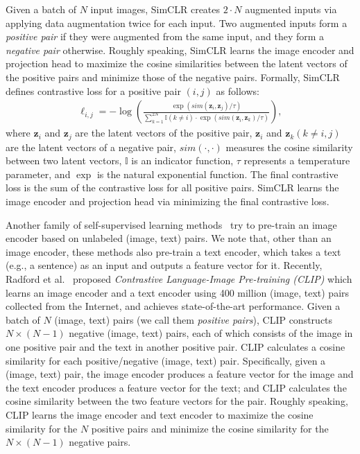 Given a batch of $N$ input images, SimCLR creates $2\cdot N$ augmented inputs via applying data augmentation twice for each input. Two augmented inputs form a \emph{positive pair} if they were augmented from the same input, and they form a \emph{negative pair} otherwise.  
Roughly speaking, SimCLR learns the image encoder and projection head to maximize the cosine similarities between the latent vectors of the positive pairs and minimize those of the negative pairs. Formally, SimCLR defines contrastive loss  for a positive pair $(i,j)$  as follows: 
\begin{align}
    \ell_{i,j} = - \log(\frac{\exp(sim(\mathbf{z}_i, \mathbf{z}_j)/\tau)}{\sum_{k=1}^{2N} \mathbb{I}(k \neq i) \cdot \exp(sim(\mathbf{z}_i, \mathbf{z}_k)/\tau) } ),
\end{align}
where $\mathbf{z}_i$ and $\mathbf{z}_j$ are the latent vectors of the positive pair, $\mathbf{z}_i$ and $\mathbf{z}_k (k \neq i, j)$ are the latent vectors of a negative pair, $sim(\cdot,\cdot)$ measures the cosine similarity between two latent vectors, $\mathbb{I}$ is an indicator function, $\tau$ represents a temperature parameter, and $\exp$ is the natural exponential function.  The final contrastive loss is the sum of the contrastive loss for all positive pairs. SimCLR learns the image encoder and projection head via minimizing the final contrastive loss. 






 Another family of self-supervised learning methods~\cite{srivastava2012multimodal,joulin2016learning,thomee2016yfcc100m,li2020unicoder,radford2021learning} try to pre-train an image encoder based on unlabeled (image, text) pairs. We note that, other than an image encoder, these methods also pre-train a text encoder, which takes a text (e.g., a sentence) as an input and outputs a feature vector for it.  
Recently, Radford et al.~\cite{radford2021learning} proposed \emph{Contrastive Language-Image Pre-training (CLIP)} which learns an image encoder and a text encoder using 400 million (image, text) pairs collected from the Internet, and achieves state-of-the-art performance. Given a batch of $N$ (image, text) pairs (we call them \emph{positive pairs}), CLIP constructs $N\times (N -1)$  negative (image, text) pairs, each of which consists of the image in one positive pair and the text in another positive pair. CLIP calculates a cosine similarity for each positive/negative (image, text) pair. Specifically, given a (image, text) pair, the image encoder produces a feature vector for the image and the text encoder produces a feature vector for the text; and CLIP calculates the cosine similarity between the two feature vectors for the pair. Roughly speaking, CLIP learns the image encoder and text encoder to maximize the cosine similarity for the $N$ positive pairs and minimize the cosine similarity for the $N\times (N -1)$  negative pairs. 




